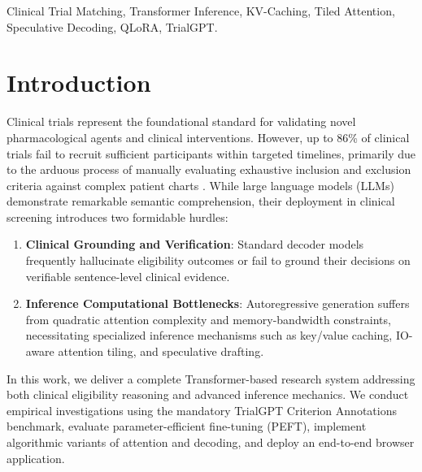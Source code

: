 \documentclass[conference]{IEEEtran}
\begin{document}
\begin{IEEEkeywords}
Clinical Trial Matching, Transformer Inference, KV-Caching, Tiled Attention, Speculative Decoding, QLoRA, TrialGPT.
\end{IEEEkeywords}

\section{Introduction}
Clinical trials represent the foundational standard for validating novel pharmacological agents and clinical interventions. However, up to 86\% of clinical trials fail to recruit sufficient participants within targeted timelines, primarily due to the arduous process of manually evaluating exhaustive inclusion and exclusion criteria against complex patient charts \cite{jin2024trialgpt}. While large language models (LLMs) demonstrate remarkable semantic comprehension, their deployment in clinical screening introduces two formidable hurdles:
\begin{enumerate}
    \item \textbf{Clinical Grounding and Verification}: Standard decoder models frequently hallucinate eligibility outcomes or fail to ground their decisions on verifiable sentence-level clinical evidence.
    \item \textbf{Inference Computational Bottlenecks}: Autoregressive generation suffers from quadratic attention complexity and memory-bandwidth constraints, necessitating specialized inference mechanisms such as key/value caching, IO-aware attention tiling, and speculative drafting.
\end{enumerate}

In this work, we deliver a complete Transformer-based research system addressing both clinical eligibility reasoning and advanced inference mechanics. We conduct empirical investigations using the mandatory TrialGPT Criterion Annotations benchmark, evaluate parameter-efficient fine-tuning (PEFT), implement algorithmic variants of attention and decoding, and deploy an end-to-end browser application.
\end{document}
